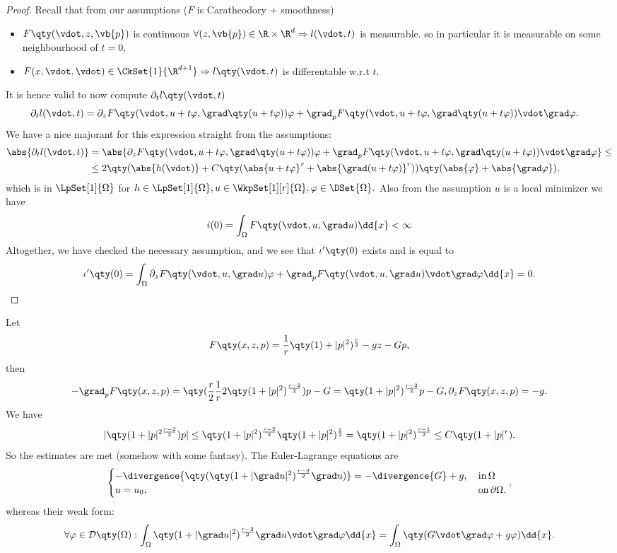 \begin{proof}
	Recall that from our assumptions ($F$ is Caratheodory + smoothness)
	\begin{itemize}
		\item $F\qty(\vdot, z, \vb{p})$ is continuous $\forall (z, \vb{p}) \in \R \times \R^{d} \Rightarrow l(\vdot, t)$ is measurable. so in particular it is measurable on some neighbourhood of $t = 0,$ 
		\item $F(x, \vdot, \vdot) \in \CkSet{1}{\R^{d+1}} \Rightarrow l\qty(\vdot, t)$ is differentable w.r.t $t$.
	\end{itemize}
	It is hence valid to now compute $\partial_{t} l\qty(\vdot, t)$  
	\begin{align*}
		\partial_t l(\vdot, t) &= \partial_{z}F\qty(\vdot, u+t \varphi, \grad \qty(u+t \varphi))\varphi + \grad_p F\qty(\vdot, u+t \varphi, \grad\qty(u+t \varphi))\vdot \grad \varphi.
	\end{align*}
	We have a nice majorant for this expression straight from the assumptions:
	\begin{align*}
		\abs{\partial_t l(\vdot, t)} &=\abs{\partial_{z}F\qty(\vdot, u+t \varphi, \grad \qty(u+t \varphi))\varphi + \grad_p F\qty(\vdot, u+t \varphi, \grad\qty(u+t \varphi))\vdot \grad \varphi} \leq \\
					     &\leq 2\qty(\abs{h(\vdot)} + C\qty(\abs{u + t \varphi}^r + \abs{\grad (u + t \varphi)}^r))\qty(\abs{\varphi} + \abs{\grad \varphi}),
	\end{align*}
	which is in $\LpSet[1]{\Omega}$ for $h \in \LpSet[1]{\Omega}, u \in \WkpSet[1][r]{\Omega}, \varphi \in \DSet{\Omega}.$ Also from the assumption $u$ is a local minimizer we have
	\[
		i(0) = \int_{\Omega}F\qty(\vdot, u, \grad u)\dd{x} < \infty
	\]
	Altogether, we have checked the necessary assumption, and we see that $\iota'\qty(0)$ exists and is equal to
	\[
		\iota'\qty(0) = \int_{\Omega}\partial_{z}F\qty(\vdot, u, \grad u)\varphi + \grad_p F\qty(\vdot, u, \grad u) \vdot \grad \varphi\dd{x} =0.
	\]
\end{proof}

\begin{example}
	Let
	\[
		F\qty(x,z,p) = \frac{1}{r}\qty(1)+|p|^{2})^{\frac{r}{2}} - gz - Gp,
	\]
	then
	\[
		- \grad_p F\qty(x,z,p) = \qty(\frac{r}{2}\frac{1}{r} 2 \qty(1+|p|^{2})^{\frac{r-2}{2}})p -G = \qty(1+|p|^{2})^{\frac{r-2}{2}}p-G, \partial_{z}F\qty(x,z,p) = -g.
	\]
	We have
	\[
		|\qty(1+|p|^{2\frac{r-2}{2}})p| \leq \qty(1+|p|^{2})^{\frac{r-2}{2}}\qty(1+|p|^{2})^{\frac{1}{2}} = \qty(1+|p|^{2})^{\frac{r-1}{2}}\leq C\qty(1+|p|^r).
	\]
	So the estimates are met (somehow with some fantasy).
	The Euler-Lagrange equations are
	\[
		\begin{cases}
			- \divergence{\qty(\qty(1+|\grad u|^{2})^{\frac{r-2}{2}}\grad u)} = - \divergence{G} + g, & \, \text{in} \, \Omega\\
			u = u_0, & \, \text{on} \, \partial \Omega.
		\end{cases},
	\]
	whereas their weak form:
	\[
		\forall \varphi \in \mathcal{D}\qty(\Omega):\int_{\Omega}\qty(1+|\grad u|^{2})^{\frac{r-2}{2}}\grad u \vdot \grad \varphi\dd{x} = \int_{\Omega}\qty(G \vdot \grad\varphi + g \varphi) \dd{x}.
	\]
\end{example}


